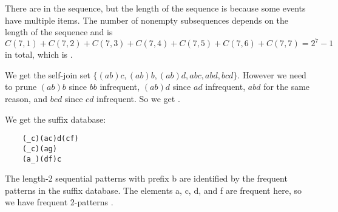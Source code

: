 \documentclass[newpage]{homework}
\begin{document}
\question
\begin{alphaparts}
    \questionpart There are  in the sequence, but the length of the sequence is  because some events have multiple items. The number of nonempty subsequences depends on the length of the sequence and is $C(7,1) + C(7,2) + C(7,3) + C(7,4) + C(7,5) + C(7,6) + C(7, 7) = 2^7 - 1$ in total, which  is .

\questionpart We get the self-join set $\{(ab)c, (ab)b, (ab)d, abc, abd, bcd\}$. However we need to prune $(ab)b$ since $bb$ infrequent, $(ab)d$ since $ad$ infrequent, $abd$ for the same reason, and $bcd$ since $cd$ infrequent. So we get .

\questionpart We get the suffix database:

\begin{verbatim}
    (_c)(ac)d(cf)
    (_c)(ag)
    (a_)(df)c
\end{verbatim}
    
\questionpart The length-2 sequential patterns with prefix b are identified by the frequent patterns in the suffix database. The elements a, c, d, and f are frequent here, so we have frequent 2-patterns .
\end{alphaparts}
\end{document}
